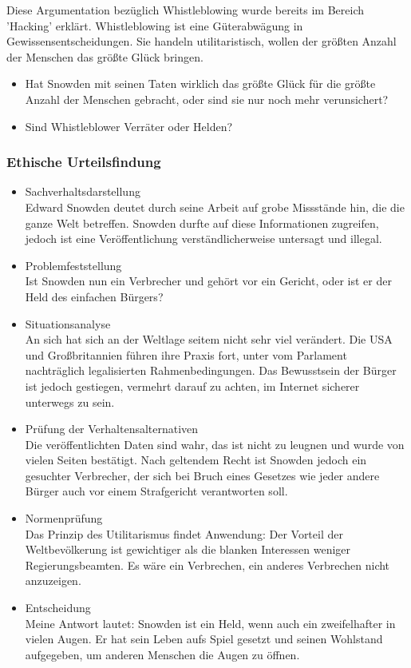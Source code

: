 \documentclass[letterpaper, 12pt]{article}
\let\tempsubsubsection\subsubsection
\renewcommand\subsubsection[1]{\vspace{0cm}\tempsubsubsection{#1}\vspace{0cm}}
\begin{document}
Diese Argumentation bezüglich Whistleblowing wurde bereits im Bereich 'Hacking' erklärt. Whistleblowing ist eine Güterabwägung in Gewissensentscheidungen. Sie handeln utilitaristisch, wollen der größten Anzahl der Menschen das größte Glück bringen.

\begin{itemize}
	\item Hat Snowden mit seinen Taten wirklich das größte Glück für die größte Anzahl der Menschen gebracht, oder sind sie nur noch mehr verunsichert?
	\item Sind Whistleblower Verräter oder Helden?
\end{itemize}

\subsubsection{Ethische Urteilsfindung}

\begin{itemize}
	\item Sachverhaltsdarstellung \\
	Edward Snowden deutet durch seine Arbeit auf grobe Missstände hin, die die ganze Welt betreffen. Snowden durfte auf diese Informationen zugreifen, jedoch ist eine Veröffentlichung verständlicherweise untersagt und illegal.
	\item Problemfeststellung \\
	Ist Snowden nun ein Verbrecher und gehört vor ein Gericht, oder ist er der Held des einfachen Bürgers?
	\item Situationsanalyse \\
	An sich hat sich an der Weltlage seitem nicht sehr viel verändert. Die USA und Großbritannien führen ihre Praxis fort, unter vom Parlament nachträglich legalisierten Rahmenbedingungen. Das Bewusstsein der Bürger ist jedoch gestiegen, vermehrt darauf zu achten, im Internet sicherer unterwegs zu sein.
	\item Prüfung der Verhaltensalternativen \\
	Die veröffentlichten Daten sind wahr, das ist nicht zu leugnen und wurde von vielen Seiten bestätigt. Nach geltendem Recht ist Snowden jedoch ein gesuchter Verbrecher, der sich bei Bruch eines Gesetzes wie jeder andere Bürger auch vor einem Strafgericht verantworten soll.
	\item Normenprüfung \\
	Das Prinzip des Utilitarismus findet Anwendung: Der Vorteil der Weltbevölkerung ist gewichtiger als die blanken Interessen weniger Regierungsbeamten. Es wäre ein Verbrechen, ein anderes Verbrechen nicht anzuzeigen.
	\item Entscheidung \\
	Meine Antwort lautet: Snowden ist ein Held, wenn auch ein zweifelhafter in vielen Augen. Er hat sein Leben aufs Spiel gesetzt und seinen Wohlstand aufgegeben, um anderen Menschen die Augen zu öffnen. 
\end{itemize}
\end{document}
